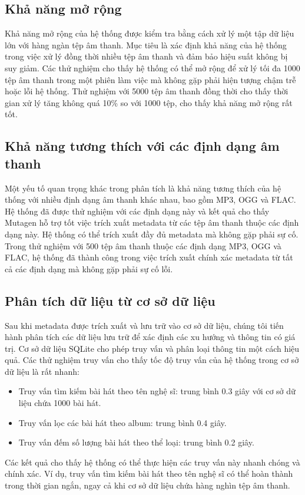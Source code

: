 \documentclass[conference]{IEEEtran}
\begin{document}
\subsection{Khả năng mở rộng}
Khả năng mở rộng của hệ thống được kiểm tra bằng cách xử lý một tập dữ liệu lớn với hàng ngàn tệp âm thanh. Mục tiêu là xác định khả năng của hệ thống trong việc xử lý đồng thời nhiều tệp âm thanh và đảm bảo hiệu suất không bị suy giảm. Các thử nghiệm cho thấy hệ thống có thể mở rộng để xử lý tối đa 1000 tệp âm thanh trong một phiên làm việc mà không gặp phải hiện tượng chậm trễ hoặc lỗi hệ thống. Thử nghiệm với 5000 tệp âm thanh đồng thời cho thấy thời gian xử lý tăng không quá 10\% so với 1000 tệp, cho thấy khả năng mở rộng rất tốt.

\subsection{Khả năng tương thích với các định dạng âm thanh}
Một yếu tố quan trọng khác trong phân tích là khả năng tương thích của hệ thống với nhiều định dạng âm thanh khác nhau, bao gồm MP3, OGG và FLAC. Hệ thống đã được thử nghiệm với các định dạng này và kết quả cho thấy Mutagen hỗ trợ tốt việc trích xuất metadata từ các tệp âm thanh thuộc các định dạng này. Hệ thống có thể trích xuất đầy đủ metadata mà không gặp phải sự cố. Trong thử nghiệm với 500 tệp âm thanh thuộc các định dạng MP3, OGG và FLAC, hệ thống đã thành công trong việc trích xuất chính xác metadata từ tất cả các định dạng mà không gặp phải sự cố lỗi.

\subsection{Phân tích dữ liệu từ cơ sở dữ liệu}
Sau khi metadata được trích xuất và lưu trữ vào cơ sở dữ liệu, chúng tôi tiến hành phân tích các dữ liệu lưu trữ để xác định các xu hướng và thông tin có giá trị. Cơ sở dữ liệu SQLite cho phép truy vấn và phân loại thông tin một cách hiệu quả. Các thử nghiệm truy vấn cho thấy tốc độ truy vấn của hệ thống trong cơ sở dữ liệu là rất nhanh:
\begin{itemize}
    \item Truy vấn tìm kiếm bài hát theo tên nghệ sĩ: trung bình 0.3 giây với cơ sở dữ liệu chứa 1000 bài hát.
    \item Truy vấn lọc các bài hát theo album: trung bình 0.4 giây.
    \item Truy vấn đếm số lượng bài hát theo thể loại: trung bình 0.2 giây.
\end{itemize}
Các kết quả cho thấy hệ thống có thể thực hiện các truy vấn này nhanh chóng và chính xác. Ví dụ, truy vấn tìm kiếm bài hát theo tên nghệ sĩ có thể hoàn thành trong thời gian ngắn, ngay cả khi cơ sở dữ liệu chứa hàng nghìn tệp âm thanh.
\end{document}
